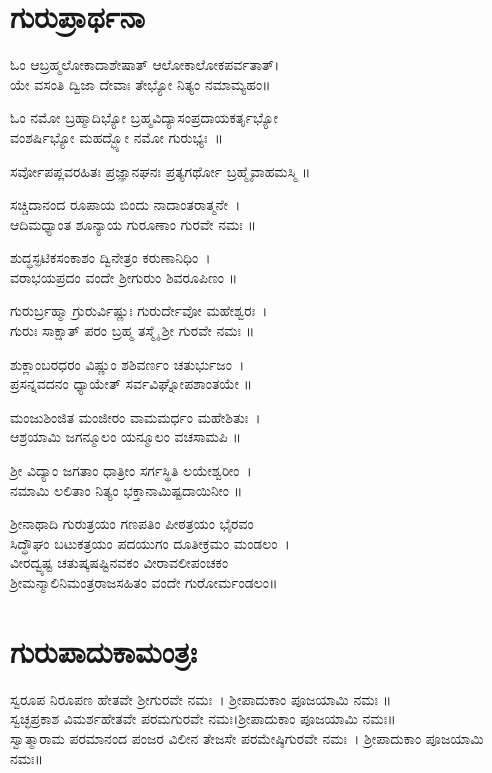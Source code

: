 \section{ಗುರುಪ್ರಾರ್ಥನಾ}
ಓಂ ಆಬ್ರಹ್ಮಲೋಕಾದಾಶೇಷಾತ್ ಆಲೋಕಾಲೋಕಪರ್ವತಾತ್।\\
ಯೇ ವಸಂತಿ ದ್ವಿಜಾ ದೇವಾಃ ತೇಭ್ಯೋ ನಿತ್ಯಂ ನಮಾಮ್ಯಹಂ॥

ಓಂ ನಮೋ ಬ್ರಹ್ಮಾದಿಭ್ಯೋ ಬ್ರಹ್ಮವಿದ್ಯಾಸಂಪ್ರದಾಯಕರ್ತೃಭ್ಯೋ\\ ವಂಶರ್ಷಿಭ್ಯೋ ಮಹದ್ಭ್ಯೋ ನಮೋ ಗುರುಭ್ಯಃ~॥

ಸರ್ವೋಪಪ್ಲವರಹಿತಃ ಪ್ರಜ್ಞಾನಘನಃ ಪ್ರತ್ಯಗರ್ಥೋ ಬ್ರಹ್ಮೈವಾಹಮಸ್ಮಿ ॥

ಸಚ್ಚಿದಾನಂದ ರೂಪಾಯ ಬಿಂದು ನಾದಾಂತರಾತ್ಮನೇ~।\\
ಆದಿಮಧ್ಯಾಂತ ಶೂನ್ಯಾಯ ಗುರೂಣಾಂ ಗುರವೇ ನಮಃ ॥

ಶುದ್ಧಸ್ಫಟಿಕಸಂಕಾಶಂ ದ್ವಿನೇತ್ರಂ ಕರುಣಾನಿಧಿಂ~।\\
ವರಾಭಯಪ್ರದಂ ವಂದೇ ಶ್ರೀಗುರುಂ ಶಿವರೂಪಿಣಂ ॥

ಗುರುರ್ಬ್ರಹ್ಮಾ ಗ್ರುರುರ್ವಿಷ್ಣುಃ ಗುರುರ್ದೇವೋ ಮಹೇಶ್ವರಃ~।\\
ಗುರುಃ ಸಾಕ್ಷಾತ್ ಪರಂ ಬ್ರಹ್ಮ ತಸ್ಮೈ ಶ್ರೀ ಗುರವೇ ನಮಃ ॥

ಶುಕ್ಲಾಂಬರಧರಂ ವಿಷ್ಣುಂ ಶಶಿವರ್ಣಂ ಚತುರ್ಭುಜಂ~।\\
ಪ್ರಸನ್ನವದನಂ ಧ್ಯಾಯೇತ್ ಸರ್ವವಿಘ್ನೋಪಶಾಂತಯೇ ॥

ಮಂಜುಶಿಂಜಿತ ಮಂಜೀರಂ ವಾಮಮರ್ಧಂ ಮಹೇಶಿತುಃ~।\\
ಆಶ್ರಯಾಮಿ ಜಗನ್ಮೂಲಂ ಯನ್ಮೂಲಂ ವಚಸಾಮಪಿ ॥

ಶ್ರೀ ವಿದ್ಯಾಂ ಜಗತಾಂ ಧಾತ್ರೀಂ ಸರ್ಗಸ್ಥಿತಿ ಲಯೇಶ್ವರೀಂ~।\\
ನಮಾಮಿ ಲಲಿತಾಂ ನಿತ್ಯಂ ಭಕ್ತಾನಾಮಿಷ್ಟದಾಯಿನೀಂ ॥

ಶ್ರೀನಾಥಾದಿ ಗುರುತ್ರಯಂ ಗಣಪತಿಂ ಪೀಠತ್ರಯಂ ಭೈರವಂ\\
ಸಿದ್ಧೌಘಂ ಬಟುಕತ್ರಯಂ ಪದಯುಗಂ ದೂತೀಕ್ರಮಂ ಮಂಡಲಂ~।\\
ವೀರದ್ವ್ಯಷ್ಟ ಚತುಷ್ಕಷಷ್ಟಿನವಕಂ ವೀರಾವಲೀಪಂಚಕಂ\\
ಶ್ರೀಮನ್ಮಾಲಿನಿಮಂತ್ರರಾಜಸಹಿತಂ ವಂದೇ ಗುರೋರ್ಮಂಡಲಂ॥

\section{ಗುರುಪಾದುಕಾಮಂತ್ರಃ}
 ಸ್ವರೂಪ ನಿರೂಪಣ ಹೇತವೇ ಶ್ರೀಗುರವೇ ನಮಃ~। ಶ್ರೀಪಾದುಕಾಂ ಪೂಜಯಾಮಿ ನಮಃ ॥\\
 ಸ್ವಚ್ಛಪ್ರಕಾಶ ವಿಮರ್ಶಹೇತವೇ ಪರಮಗುರವೇ ನಮಃ।ಶ್ರೀಪಾದುಕಾಂ ಪೂಜಯಾಮಿ ನಮಃ॥\\
 ಸ್ವಾತ್ಮಾರಾಮ ಪರಮಾನಂದ ಪಂಜರ ವಿಲೀನ ತೇಜಸೇ ಪರಮೇಷ್ಠಿಗುರವೇ ನಮಃ~। ಶ್ರೀಪಾದುಕಾಂ ಪೂಜಯಾಮಿ ನಮಃ॥

